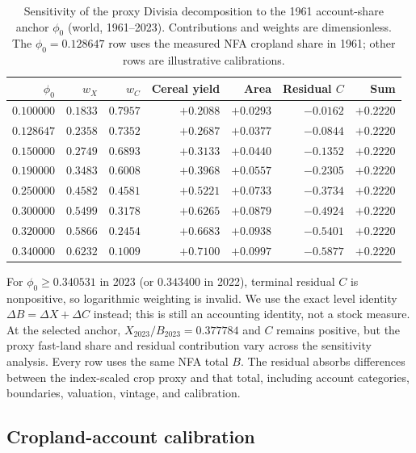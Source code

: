 \documentclass[11pt,a4paper]{article}
\begin{document}
\begin{table}[htbp]
\centering\footnotesize
\caption{Sensitivity of the proxy Divisia decomposition to the 1961 account-share anchor $\phi_0$ (world, 1961--2023). Contributions and weights are dimensionless. The $\phi_0=0.128647$ row uses the measured NFA cropland share in 1961; other rows are illustrative calibrations.}
\label{tab:si_phi0}
\begin{tabular}{r r r r r r r}
\toprule
$\phi_0$ & $w_X$ & $w_C$ & Cereal yield & Area & Residual $C$ & Sum \\
\midrule
$0.100000$ & $0.1833$ & $0.7957$ & $+0.2088$ & $+0.0293$ & $-0.0162$ & $+0.2220$ \\
$0.128647$ & $0.2358$ & $0.7352$ & $+0.2687$ & $+0.0377$ & $-0.0844$ & $+0.2220$ \\
$0.150000$ & $0.2749$ & $0.6893$ & $+0.3133$ & $+0.0440$ & $-0.1352$ & $+0.2220$ \\
$0.190000$ & $0.3483$ & $0.6008$ & $+0.3968$ & $+0.0557$ & $-0.2305$ & $+0.2220$ \\
$0.250000$ & $0.4582$ & $0.4581$ & $+0.5221$ & $+0.0733$ & $-0.3734$ & $+0.2220$ \\
$0.300000$ & $0.5499$ & $0.3178$ & $+0.6265$ & $+0.0879$ & $-0.4924$ & $+0.2220$ \\
$0.320000$ & $0.5866$ & $0.2454$ & $+0.6683$ & $+0.0938$ & $-0.5401$ & $+0.2220$ \\
$0.340000$ & $0.6232$ & $0.1009$ & $+0.7100$ & $+0.0997$ & $-0.5877$ & $+0.2220$ \\
\bottomrule
\end{tabular}
\end{table}

For $\phi_0\ge0.340531$ in 2023 (or $0.343400$ in 2022), terminal residual $C$ is nonpositive, so logarithmic weighting is invalid. We use the exact level identity $\Delta B=\Delta X+\Delta C$ instead; this is still an accounting identity, not a stock measure. At the selected anchor, $X_{2023}/B_{2023}=0.377784$ and $C$ remains positive, but the proxy fast-land share and residual contribution vary across the sensitivity analysis. Every row uses the same NFA total $B$. The residual absorbs differences between the index-scaled crop proxy and that total, including account categories, boundaries, valuation, vintage, and calibration.

\subsection{Cropland-account calibration}\label{si:cropland}
\end{document}

